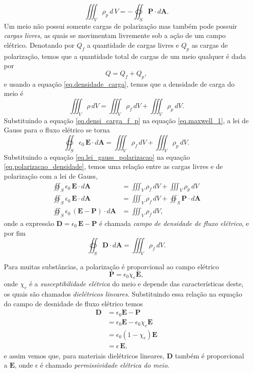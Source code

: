 \begin{equation}\label{eq.polarizacao_densidade}
\iiint_V\rho_p\,d\,V=-\oiint_S\mathbf{P}\cdot d\mathbf{A}.
\end{equation}
Um meio não possui somente cargas de polarização mas também pode possuir \textit{cargas livres}, as quais se movimentam livremente sob a ação de um campo elétrico. Denotando por $Q_f$ a quantidade de cargas livres e $Q_p$ as cargas de polarização, temos que a quantidade total de cargas de um meio qualquer é dada por
\begin{equation*}
Q=Q_f+Q_p,
\end{equation*} 
e usando a equação \ref{eq.densidade_carga}, temos que a densidade de carga do meio é
\begin{equation}\label{eq.densi_carga_f_p}
\iiint_{V}\rho\,dV=\iiint_{V}\rho_f\,dV+\iiint_{V}\rho_p\,dV.
\end{equation}
Substituindo a equação \ref{eq.densi_carga_f_p} na equação \ref{eq.maxwell_1}, a lei de Gauss para o fluxo elétrico se torna
\begin{equation}\label{eq.lei_gauss_polarizacao}
\oiint_S\epsilon_0\,\mathbf{E}\cdot d\mathbf{A}=\iiint_{V}\rho_f\,dV+\iiint_{V}\rho_p\,dV.
\end{equation}
Substituindo a equação \ref{eq.lei_gauss_polarizacao} na equação \ref{eq.polarizacao_densidade}, temos uma relação entre as cargas livres e de polarização com a lei de Gauss,
\begin{align*}
\oiint_S\epsilon_0\,\mathbf{E}\cdot d\mathbf{A}&=\iiint_{V}\rho_f\,dV+\iiint_{V}\rho_p\,dV\\
\oiint_S\epsilon_0\,\mathbf{E}\cdot d\mathbf{A}&=\iiint_{V}\rho_f\,dV+\oiint_S\mathbf{P}\cdot d\mathbf{A}\\
\oiint_S\epsilon_0\,(\mathbf{E}-\mathbf{P})\cdot d\mathbf{A}&=\iiint_{V}\rho_f\,dV,
\end{align*}
onde a expressão $\mathbf{D}=\epsilon_0\,\mathbf{E}-\mathbf{P}$ é chamada \textit{campo de densidade de fluxo elétrico}, e por fim
\begin{equation*}
\oiint_S\mathbf{D}\cdot d\mathbf{A}=\iiint_{V}\rho_f\,dV.
\end{equation*}

Para muitas subst\^ancias, a polariza\c{c}\~ao \'e proporcional ao campo el\'etrico
\begin{equation*}
\mathbf{P}=\epsilon_0\chi_e\mathbf{E},
\end{equation*}
onde $\chi_e$ \'e a \textit{susceptibilidade el\'etrica} do meio e depende das caracter\'isticas deste, os quais s\~ao chamados \textit{diel\'etricos lineares}. Substituindo essa rela\c{c}\~ao na equa\c{c}\~ao do campo de desnidade de fluxo el\'etrico temos
\begin{align*}
\mathbf{D}&=\epsilon_0\mathbf{E}-\mathbf{P}\\
&=\epsilon_0\mathbf{E}-\epsilon_0\chi_e\mathbf{E}\\
&=\epsilon_0(1-\chi_e)\mathbf{E}\\
&=\epsilon\,\mathbf{E},
\end{align*}
e assim vemos que, para materiais diel\'etricos lineares, $\mathbf{D}$ tamb\'em \'e proporcional a $\mathbf{E}$, onde $\epsilon$ \'e chamado \textit{permissividade el\'etrica do meio}.

